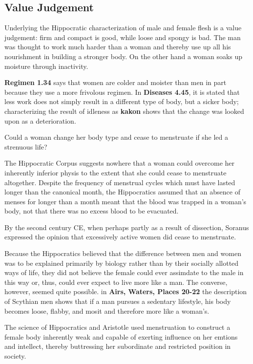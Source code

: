 \subsection{Value Judgement}

Underlying the Hippocratic characterization of male and female flesh is a value judgement: firm and compact is good, while loose and spongy is bad. The man was thought to work much harder than a woman and thereby use up all his nourishment in building a stronger body. On the other hand a woman soaks up moisture through inactivity.

\textbf{Regimen 1.34} says that women are colder and moister than men in part because they use a more frivolous regimen. In \textbf{Diseases 4.45}, it is stated that less work does not simply result in a different type of body, but a sicker body; characterizing the result of idleness as \textbf{kakon} shows that the change was looked upon as a deterioration. 

\begin{qst}
    Could a woman change her body type and cease to menstruate if she led a strenuous life?
\end{qst}
The Hippocratic Corpus suggests nowhere that a woman could overcome her inherently inferior physis to the extent that she could cease to menstruate altogether. Despite the frequency of menstrual cycles which must have lasted longer than the canonical month, the Hippocratics assumed that an absence of menses for longer than a month meant that the blood was trapped in a woman's body, not that there was no excess blood to be evacuated.

\begin{nte}
    By the second century CE, when perhaps partly as a result of dissection, Soranus expressed the opinion that excessively active women did cease to menstruate.
\end{nte}

Because the Hippocratics believed that the difference between men and women was to be explained primarily by biology rather than by their socially allotted ways of life, they did not believe the female could ever assimdate to the male in this way or, thus, could ever expect to live more like a man. The converse, however, seemed quite possible. in \textbf{Airs, Waters, Places 20-22} the description of Scythian men shows that if a man pursues a sedentary lifestyle, his body becomes loose, flabby, and mosit and therefore more like a woman's.

The science of Hippocratics and Aristotle used menstruation to construct a female body inherently weak and capable of exerting influence on her emtions and intellect, thereby buttressing her subordinate and restricted position in society. 

